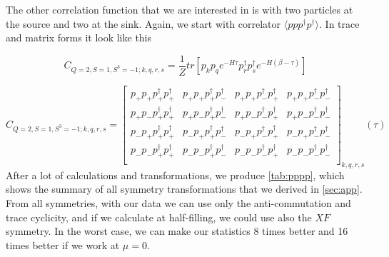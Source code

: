 The other correlation function that we are interested in is with two particles at the source and two at the sink. Again, we start with correlator $\langle ppp^\dagger p^\dagger\rangle$. In trace and matrix forms it look like this

\begin{equation}
  C_{Q=2,S=1,S^3=-1;k,q,r,s} = \frac{1}{Z}tr\left[p_kp_qe^{-H\tau}p^\dagger_rp^\dagger_se^{-H\left(\beta-\tau\right)}\right]
\end{equation}

\renewcommand{\cor}[4]{p_{#1}p_{#2}p^\dagger_{#3}p^\dagger_{#4}}
\begin{equation}
  C_{Q=2,S=1,S^3=-1;k,q,r,s} =
  \left[
  \begin{array}{cccc}
    \cor{+}{+}{+}{+} & \cor{+}{+}{+}{-} & \cor{+}{+}{-}{+} & \cor{+}{+}{-}{-} \\
    \cor{+}{-}{+}{+} & \cor{+}{-}{+}{-} & \cor{+}{-}{-}{+} & \cor{+}{-}{-}{-} \\
    \cor{-}{+}{+}{+} & \cor{-}{+}{+}{-} & \cor{-}{+}{-}{+} & \cor{-}{+}{-}{-} \\
    \cor{-}{-}{+}{+} & \cor{-}{-}{+}{-} & \cor{-}{-}{-}{+} & \cor{-}{-}{-}{-} \\
  \end{array}
  \right]_{k,q,r,s} (\tau)
\end{equation}
After a lot of calculations and transformations, we produce   \cref{tab:pppp}, which shows the summary of all symmetry transformations that we derived in \cref{sec:app}. From all symmetries, with our data we can use only the anti-commutation and trace cyclicity, and if we calculate at half-filling, we could use also the $XF$ symmetry. In the worst case, we can make our statistics 8 times better and 16 times better if we work at $\mu = 0$.


